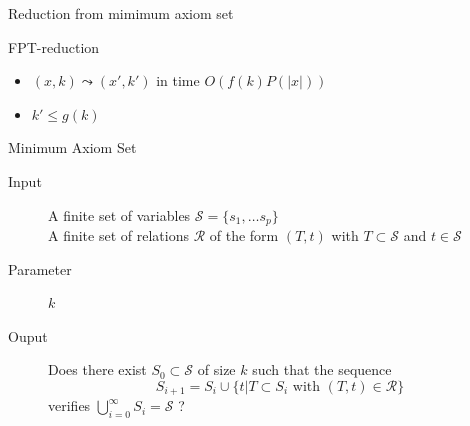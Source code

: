 \documentclass[11pt,xcolor=dvipsnames,presentation]{beamer}
\begin{document}
\begin{frame}{Reduction from mimimum axiom set}
  \begin{block}{FPT-reduction}
    \begin{itemize}
    \item $(x,k) \leadsto (x',k')$ in time $O(f(k)P(|x|))$
    \item $k' \le g(k)$
    \end{itemize}
  \end{block}
  
  \begin{block}{Minimum Axiom Set}
  \begin{description}
  \item[Input] A finite set of variables $\mathcal{S} = \{s_1, \dots s_p\}$\\
    A finite set of relations $\mathcal{R}$ of the form $(T,t)$ with $T \subset
    \mathcal{S}$ and $t \in \mathcal{S}$
  \item[Parameter] $k$
  \item[Ouput] Does there exist $S_0 \subset \mathcal{S}$ of size $k$ such that
    the sequence $$S_{i+1} = S_i \cup \{t | T \subset S_i \text{ with } (T,t)
    \in \mathcal{R}\}$$ verifies $\bigcup_{i=0}^\infty S_i = \mathcal{S}$ ?
  \end{description}
\end{block}
\end{frame}
\end{document}

